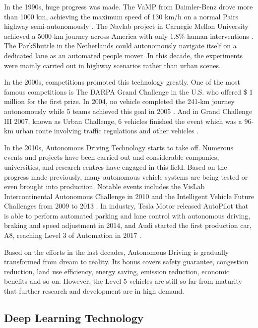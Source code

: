 \documentclass[a4paper,12pt]{article}
\begin{document}
In the 1990s, huge progress was made. The VaMP from Daimler-Benz drove more than 1000 km, achieving the maximum speed of 130 km/h on a normal Pairs highway semi-autonomously \cite{schj}. The Navlab project in Carnegie Mellon University achieved a 5000-km journey across America with only 1.8\% human interventions \cite{nohand}. The ParkShuttle in the Netherlands could autonomously navigate itself on a dedicated lane as an automated people mover \cite{parkshuttle}.In this decade, the experiments were mainly carried out in highway scenarios rather than urban scenes.

In the 2000s, competitions promoted this technology greatly. One of the most famous competitions is The DARPA Grand Challenge in the U.S. who offered \$ 1 million for the first prize. In 2004, no vehicle completed the 241-km journey autonomously while 5 teams achieved this goal in 2005 \cite{Buehler2007}. And in Grand Challenge III 2007, known as Urban Challenge, 6 vehicles  finished the event which was a 96-km urban route involving traffic regulations and other vehicles \cite{Buehler2009}.

In the 2010s,  Autonomous Driving Technology starts to take off. Numerous events and projects have been carried out and considerable companies, universities, and research centres have engaged in this field. Based on the progress made previously, many autonomous vehicle systems are being tested or even brought into production.  Notable events includes the VisLab Intercontinental Autonomous Challenge in 2010 \cite{doi:10.1504/IJVAS.2012.051250} and the Intelligent Vehicle Future Challenges from 2009 to 2013 \cite{newlet00}. In industry, Tesla Motor released AutoPilot  that is able to perform automated parking and lane control with autonomous driving, braking and speed adjustment in 2014, and  Audi started the first production car, A8,  reaching Level 3 of Automation in 2017 \cite{historyad}.

Based on the efforts in the last decades, Autonomous Driving is gradually transformed from dream to reality. Its bonus covers safety guarantee, congestion reduction, land use efficiency, energy saving, emission reduction, economic benefits and so on. However, the Level 5 vehicles are still so far from maturity that further research and development are in high demand.

\clearpage

\subsection{Deep Learning Technology}
\label{dlt}
\end{document}
